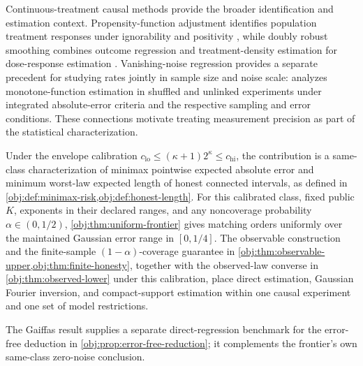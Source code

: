 Continuous-treatment causal methods provide the broader identification and estimation context. Propensity-function adjustment identifies population treatment responses under ignorability and positivity \citep[Section 2]{Imai2004}, while doubly robust smoothing combines outcome regression and treatment-density estimation for dose-response estimation \citep[pp.~1229--1230]{Kennedy2017}. Vanishing-noise regression provides a separate precedent for studying rates jointly in sample size and noise scale: \citet[Sections 3--4]{DurotMukherjee2026} analyzes monotone-function estimation in shuffled and unlinked experiments under integrated absolute-error criteria and the respective sampling and error conditions. These connections motivate treating measurement precision as part of the statistical characterization.

Under the envelope calibration \(c_{\mathrm{lo}}\le(\kappa+1)2^\kappa\le c_{\mathrm{hi}}\), the contribution is a same-class characterization of minimax pointwise expected absolute error and minimum worst-law expected length of honest connected intervals, as defined in \cref{obj:def:minimax-risk,obj:def:honest-length}. For this calibrated class, fixed public \(K\), exponents in their declared ranges, and any noncoverage probability \(\alpha\in(0,1/2)\), \cref{obj:thm:uniform-frontier} gives matching orders uniformly over the maintained Gaussian error range  in \([0,1/4]\). The observable construction and the finite-sample \((1-\alpha)\)-coverage guarantee in \cref{obj:thm:observable-upper,obj:thm:finite-honesty}, together with the observed-law converse in \cref{obj:thm:observed-lower} under this calibration, place direct estimation, Gaussian Fourier inversion, and compact-support estimation within one causal experiment and one set of model restrictions.

The Gaiffas result supplies a separate direct-regression benchmark for the error-free deduction in \cref{obj:prop:error-free-reduction}; it complements the frontier's own same-class zero-noise conclusion.

